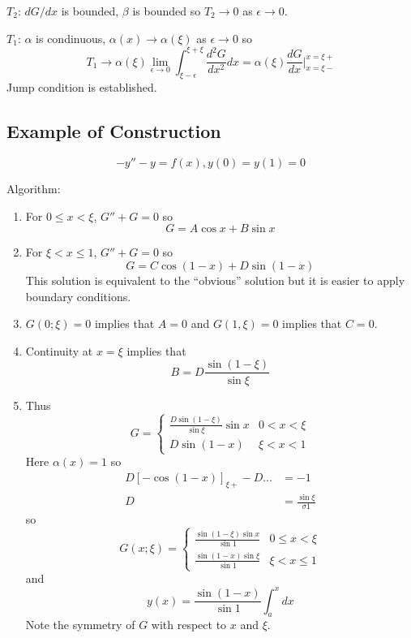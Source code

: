 \documentclass[a4paper]{article}
\begin{document}
\(T_2\): \(dG/dx\) is bounded, \(\beta\) is bounded so \(T_2 \to 0\) as \(\epsilon \to 0\).

\(T_1\): \(\alpha\) is condinuous, \(\alpha(x) \to \alpha(\xi)\) as \(\epsilon \to 0\) so
\[
  T_1 \to \alpha(\xi) \lim_{\epsilon \to 0} \int_{\xi - \epsilon}^{\xi + \xi} \frac{d^2G}{dx^2} dx = \alpha(\xi) \frac{dG}{dx} \Big|_{x = \xi-}^{x = \xi+}
\]
Jump condition is established.

\subsection{Example of Construction}

\[
  -y'' - y = f(x), y(0) = y(1) = 0
\]

Algorithm:
\begin{enumerate}
\item For \(0 \leq x < \xi\), \(G'' + G = 0\) so
  \[
    G = A \cos x + B \sin x
  \]
\item For \(\xi < x \leq 1\), \(G'' + G = 0\) so
  \[
    G = C \cos (1 - x) + D \sin (1 - x)
  \]
  This solution is equivalent to the ``obvious'' solution but it is easier to apply boundary conditions.
\item \(G(0; \xi) = 0\) implies that \(A = 0\) and \(G(1, \xi) = 0\) implies that \(C = 0\).
\item Continuity at \(x = \xi\) implies that
  \[
    B = D \frac{\sin (1 - \xi)}{\sin \xi}
  \]
\item Thus
  \[
    G =
    \begin{cases}
      \frac{D \sin(1 - \xi)}{\sin \xi} \sin x & 0 < x < \xi \\
      D \sin (1 - x) & \xi < x < 1
    \end{cases}
  \]
  Here \(\alpha(x) = 1\) so
  \begin{align*}
    D [-\cos (1 - x)]_{\xi+} - D \dots &= -1 \\
    D &= \frac{\sin \xi}{\sigma 1}
  \end{align*}
  so
  \[
    G(x; \xi) =
    \begin{cases}
      \frac{\sin(1 - \xi) \sin x}{\sin 1} & 0 \leq x < \xi \\
      \frac{\sin(1 - x) \sin \xi}{\sin 1} & \xi < x \leq 1
    \end{cases}
  \]
  and
  \[
    y(x) = \frac{\sin(1 - x)}{\sin 1} \int_{a}^{x}  dx
  \]
  Note the symmetry of \(G\) with respect to \(x\) and \(\xi\).
\end{enumerate}
\end{document}
